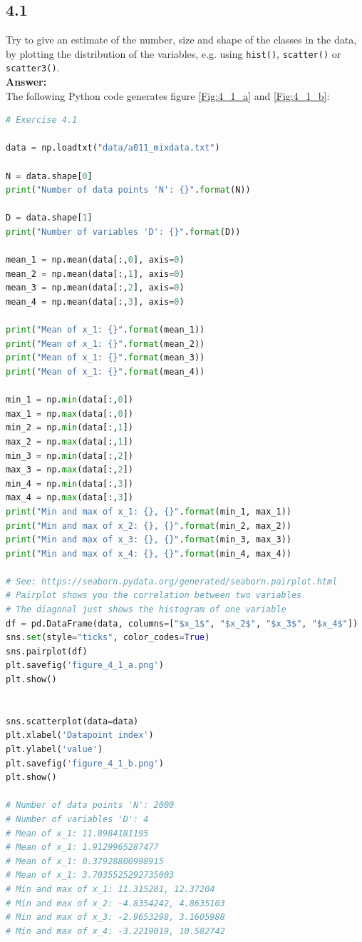 \documentclass[a4paper]{article}
\begin{document}
\subsection*{4.1}

Try to give an estimate of the number, size and shape of the classes in the data, by plotting the distribution of the variables, e.g. using \texttt{hist()}, \texttt{scatter()} or \texttt{scatter3()}.\\

\textbf{Answer:}\\

The following Python code generates figure \ref{Fig:4_1_a} and \ref{Fig:4_1_b}:

\begin{lstlisting}[language=Python]
# Exercise 4.1

data = np.loadtxt("data/a011_mixdata.txt")

N = data.shape[0]
print("Number of data points 'N': {}".format(N))

D = data.shape[1]
print("Number of variables 'D': {}".format(D))

mean_1 = np.mean(data[:,0], axis=0)
mean_2 = np.mean(data[:,1], axis=0)
mean_3 = np.mean(data[:,2], axis=0)
mean_4 = np.mean(data[:,3], axis=0)

print("Mean of x_1: {}".format(mean_1))
print("Mean of x_1: {}".format(mean_2))
print("Mean of x_1: {}".format(mean_3))
print("Mean of x_1: {}".format(mean_4))

min_1 = np.min(data[:,0])
max_1 = np.max(data[:,0])
min_2 = np.min(data[:,1])
max_2 = np.max(data[:,1])
min_3 = np.min(data[:,2])
max_3 = np.max(data[:,2])
min_4 = np.min(data[:,3])
max_4 = np.max(data[:,3])
print("Min and max of x_1: {}, {}".format(min_1, max_1))
print("Min and max of x_2: {}, {}".format(min_2, max_2))
print("Min and max of x_3: {}, {}".format(min_3, max_3))
print("Min and max of x_4: {}, {}".format(min_4, max_4))

# See: https://seaborn.pydata.org/generated/seaborn.pairplot.html
# Pairplot shows you the correlation between two variables
# The diagonal just shows the histogram of one variable
df = pd.DataFrame(data, columns=["$x_1$", "$x_2$", "$x_3$", "$x_4$"])
sns.set(style="ticks", color_codes=True)
sns.pairplot(df)
plt.savefig('figure_4_1_a.png')
plt.show()


sns.scatterplot(data=data)
plt.xlabel('Datapoint index')
plt.ylabel('value')
plt.savefig('figure_4_1_b.png')
plt.show()

# Number of data points 'N': 2000
# Number of variables 'D': 4
# Mean of x_1: 11.8984181195
# Mean of x_1: 1.9129965287477
# Mean of x_1: 0.37928800998915
# Mean of x_1: 3.7035525292735003
# Min and max of x_1: 11.315281, 12.37204
# Min and max of x_2: -4.8354242, 4.8635103
# Min and max of x_3: -2.9653298, 3.1605988
# Min and max of x_4: -3.2219019, 10.582742
\end{lstlisting}
\end{document}
